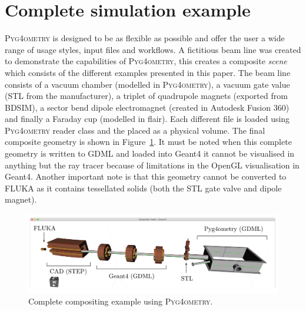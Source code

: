 \documentclass[final,5p,times,twocolumn]{elsarticle}
\newcommand{\PYGEOMETRY}{\textsc{Pyg4ometry}}
\begin{document}
\section{Complete simulation example}
\PYGEOMETRY{} is designed to be as flexible as possible and offer the user a wide range of usage styles, input files 
and workflows. A fictitious beam line was created to demonstrate the capabilities of \PYGEOMETRY, this creates a composite 
{\it scene} which consists of the different examples presented in this paper. The beam line consists of a vacuum chamber 
(modelled in \PYGEOMETRY{}), a vacuum gate value (STL from the manufacturer), a triplet of quadrupole magnets (exported 
from BDSIM), a sector bend dipole electromagnet (created in Autodesk Fusion 360) and finally a Faraday cup (modelled in 
flair). Each different file is loaded using \PYGEOMETRY{} reader class and the placed as a physical volume. The final composite 
geometry is shown in Figure~\ref{fig:model}. It must be noted when this complete geometry is written to GDML and loaded into 
Geant4 it cannot be visualised in anything but the ray tracer because of limitations in the OpenGL visualisation in Geant4. Another 
important note is that this geometry cannot be converted to FLUKA as it contains tessellated solids (both the STL gate valve and
dipole magnet). 
%
\begin{figure}
\begin{center}
\includegraphics[width=1.0\textwidth]{./model-scene/model.pdf}
\caption{Complete compositing example using \PYGEOMETRY{}.}
\label{fig:model}
\end{center}
\end{figure}
\end{document}
